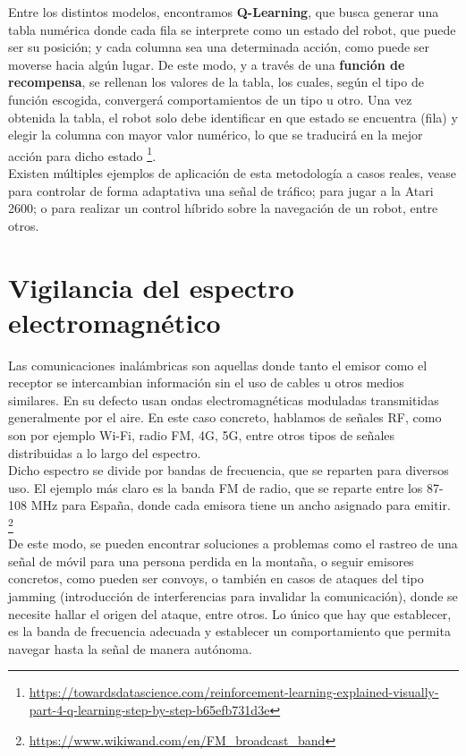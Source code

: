 Entre los distintos modelos, encontramos \textbf{Q-Learning}, que busca generar una tabla numérica donde cada fila se interprete como un estado del robot, que puede ser su posición; y cada columna sea una determinada acción, como puede ser moverse hacia algún lugar. De este modo, y a través de una \textbf{función de recompensa}, se rellenan los valores de la tabla, los cuales, según el tipo de función escogida, convergerá comportamientos de un tipo u otro. Una vez obtenida la tabla, el robot solo debe identificar en que estado se encuentra (fila) y elegir la columna con mayor valor numérico, lo que se traducirá en la mejor acción para dicho estado \footnote[20]{\url{https://towardsdatascience.com/reinforcement-learning-explained-visually-part-4-q-learning-step-by-step-b65efb731d3e}}.\\

Existen múltiples ejemplos de aplicación de esta metodología a casos reales, vease para controlar de forma adaptativa una señal de tráfico; para jugar a la Atari 2600; o para realizar un control híbrido sobre la navegación de un robot, entre otros. \cite{q-learning-app}\\

\section{Vigilancia del espectro electromagnético}
\label{subsec:señales}

Las comunicaciones inalámbricas son aquellas donde tanto el emisor como el receptor se intercambian información sin el uso de cables u otros medios similares. En su defecto usan ondas electromagnéticas moduladas transmitidas generalmente por el aire. En este caso concreto, hablamos de señales \ac{RF}, como son por ejemplo Wi-Fi, radio FM, 4G, 5G, entre otros tipos de señales distribuidas a lo largo del espectro.\\

Dicho espectro se divide por bandas de frecuencia, que se reparten para diversos uso. El ejemplo más claro es la banda FM de radio, que se reparte entre los 87-108 MHz para España, donde cada emisora tiene un ancho asignado para emitir. \footnote[21]{\url{https://www.wikiwand.com/en/FM_broadcast_band}}\\

De este modo, se pueden encontrar soluciones a problemas como el rastreo de una señal de móvil para una persona perdida en la montaña, o seguir emisores concretos, como pueden ser convoys, o también en casos de ataques del tipo jamming (introducción de interferencias para invalidar la comunicación), donde se necesite hallar el origen del ataque, entre otros. Lo único que hay que establecer, es la banda de frecuencia adecuada y establecer un comportamiento que permita navegar hasta la señal de manera autónoma.\\

